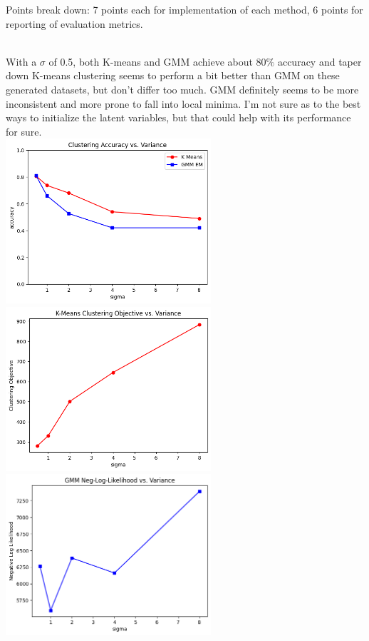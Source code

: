 \documentclass[a4paper]{article}
\theoremstyle{definition}
\newenvironment{soln}{
	\leavevmode\color{blue}\ignorespaces
}{}
\begin{document}
Points break down: 7 points each for implementation of each method, 6 points for reporting of
evaluation metrics.
\\ \\
\begin{soln}
	With a $\sigma$ of 0.5, both K-means and GMM achieve about $80\%$ accuracy and taper down 
	K-means clustering seems to perform a bit better than GMM on these generated datasets, but don't differ too much. GMM definitely seems to be more inconsistent and more prone to fall into local minima. I'm not sure as to the best ways to initialize the latent variables, but that could help with its performance for sure. \\
	\includegraphics[width=3in]{acc_vs_var.png} \\
	\includegraphics[width=3in]{obj_vs_var.png} \\
	\includegraphics[width=3in]{nll_vs_var.png} \\
\end{soln}
\end{document}
